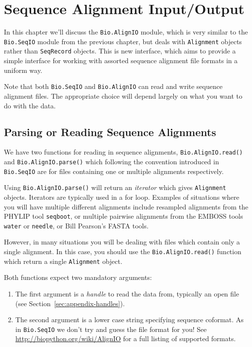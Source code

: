 \documentclass{report}
\begin{document}
\chapter{Sequence Alignment Input/Output}
\label{chapter:Bio.AlignIO}

In this chapter we'll discuss the \verb|Bio.AlignIO| module, which is very similar to the \verb|Bio.SeqIO| module from the previous chapter, but deals with \verb|Alignment| objects rather than \verb|SeqRecord| objects.  This is new interface, which aims to provide a simple interface for working with assorted sequence alignment file formats in a uniform way.

Note that both \verb|Bio.SeqIO| and \verb|Bio.AlignIO| can read and write sequence alignment files.  The appropriate choice will depend largely on what you want to do with the data.

\section{Parsing or Reading Sequence Alignments}

We have two functions for reading in sequence alignments, \verb|Bio.AlignIO.read()| and \verb|Bio.AlignIO.parse()| which following the convention introduced in \verb|Bio.SeqIO| are for files containing one or multiple alignments respectively.

Using \verb|Bio.AlignIO.parse()| will return an {\it iterator} which gives \verb|Alignment| objects.  Iterators are typically used in a for loop.  Examples of situations where you will have multiple different alignments include resampled alignments from the PHYLIP tool \verb|seqboot|, or multiple pairwise alignments from the EMBOSS tools \verb|water| or \verb|needle|, or Bill Pearson's FASTA tools.

However, in many situations you will be dealing with files which contain only a single alignment.  In this case, you should use the \verb|Bio.AlignIO.read()| function which return a single \verb|Alignment| object.

Both functions expect two mandatory arguments:

\begin{enumerate}
\item The first argument is a {\it handle} to read the data from, typically an open file (see Section~\ref{sec:appendix-handles}).
\item The second argument is a lower case string specifying sequence coformat.  As in \verb|Bio.SeqIO| we don't try and guess the file format for you!  See \url{http://biopython.org/wiki/AlignIO} for a full listing of supported formats.
\end{enumerate}
\end{document}
